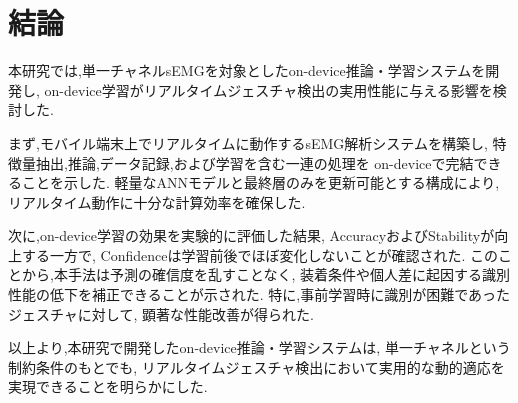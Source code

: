 \chapter{結論}

本研究では,単一チャネルsEMGを対象としたon-device推論・学習システムを開発し,
on-device学習がリアルタイムジェスチャ検出の実用性能に与える影響を検討した.

まず,モバイル端末上でリアルタイムに動作するsEMG解析システムを構築し,
特徴量抽出,推論,データ記録,および学習を含む一連の処理を
on-deviceで完結できることを示した.
軽量なANNモデルと最終層のみを更新可能とする構成により,
リアルタイム動作に十分な計算効率を確保した.

次に,on-device学習の効果を実験的に評価した結果,
AccuracyおよびStabilityが向上する一方で,
Confidenceは学習前後でほぼ変化しないことが確認された.
このことから,本手法は予測の確信度を乱すことなく,
装着条件や個人差に起因する識別性能の低下を補正できることが示された.
特に,事前学習時に識別が困難であったジェスチャに対して,
顕著な性能改善が得られた.

以上より,本研究で開発したon-device推論・学習システムは,
単一チャネルという制約条件のもとでも,
リアルタイムジェスチャ検出において実用的な動的適応を実現できることを明らかにした.
